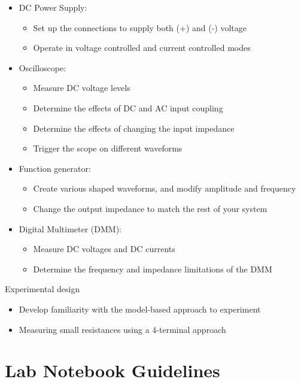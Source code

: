 \documentclass[10pt]{PhysLab1C} %
\begin{document}
\begin{itemize}
\item
  DC Power Supply:
  
  \begin{itemize}
  \item
    Set up the connections to supply both (+) and (-) voltage
  \item
    Operate in voltage controlled and current controlled modes
  \end{itemize}
\item
  Oscilloscope:

  \begin{itemize}
  \item
    Measure DC voltage levels
  \item
    Determine the effects of DC and AC input coupling
  \item
    Determine the effects of changing the input impedance
  \item
    Trigger the scope on different waveforms
  \end{itemize}
\item
  Function generator:

  \begin{itemize}
  \item
    Create various shaped waveforms, and modify amplitude and frequency
  \item
    Change the output impedance to match the rest of your system
  \end{itemize}
\item
  Digital Multimeter (DMM):

  \begin{itemize}
  \item
    Measure DC voltages and DC currents
  \item
    Determine the frequency and impedance limitations of the DMM
  \end{itemize}
\end{itemize}

Experimental design

\begin{itemize}
\item
  Develop familiarity with the model-based approach to experiment
\item
  Measuring small resistances using a 4-terminal approach
\end{itemize}


\section{Lab Notebook Guidelines}
\end{document}

